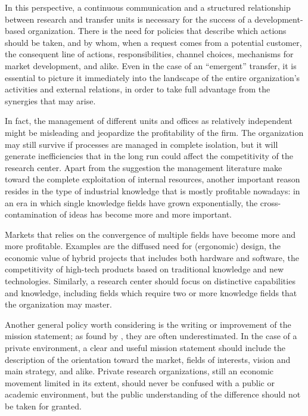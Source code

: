 In this perspective, a continuous communication and a structured relationship between research and transfer units is necessary for the success of a development-based organization. There is the need for policies that describe which actions should be taken, and by whom, when a request comes from a potential customer, the consequent line of actions, responsibilities, channel choices, mechanisms for market development, and alike. Even in the case of an \enquote{emergent} transfer, it is essential to picture it immediately into the landscape of the entire organization's activities and external relations, in order to take full advantage from the synergies that may arise. 

In fact, the management of different units and offices as relatively independent might be misleading and jeopardize the profitability of the firm. The organization may still survive if processes are managed in complete isolation, but it will generate inefficiencies that in the long run could affect the competitivity of the research center. Apart from the suggestion the management literature make toward the complete exploitation of internal resources, another important reason resides in the type of industrial knowledge that is mostly profitable nowadays: in an era in which single knowledge fields have grown exponentially, the cross-contamination of ideas has become more and more important. 

Markets that relies on the convergence of multiple fields have become more and more profitable. Examples are the diffused need for (ergonomic) design, the economic value of hybrid projects that includes both hardware and software, the competitivity of high-tech products based on traditional knowledge and new technologies. Similarly, a research center should focus on distinctive capabilities and knowledge, including fields which require two or more knowledge fields that the organization may master. 
 
Another general policy worth considering is the writing or improvement of the mission statement; as found by \citet{Fitzgerald2015}, they are often underestimated. In the case of a private environment, a clear and useful mission statement should include the description of the orientation toward the market, fields of interests, vision and main strategy, and alike. Private research organizations, still an economic movement limited in its extent, should never be confused with a public or academic environment, but the public understanding of the difference should not be taken for granted. 

